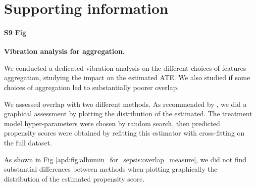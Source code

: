 \documentclass[10pt,letterpaper]{article}
\begin{document}
\vspace*{0.2in}

\section*{Supporting information}


\paragraph*{S9 Fig}
\label{apd:vibration_analysis_for_aggregation}
{\bf Vibration analysis for aggregation.}

We conducted a dedicated vibration analysis on the different choices of
features aggregation, studying the impact on the estimated ATE. We also
studied if some choices of aggregation led to substantially poorer overlap.

We assessed overlap with two different methods. As recommended by
\cite{austin2015moving}, we did a graphical assessment by plotting the
distribution of the estimated. The treatment model hyper-parameters were chosen
by random search, then predicted propensity scores were obtained by refitting
this estimator with cross-fitting on the full dataset.

As shown in Fig \ref{apd:fig:albumin_for_sepsis:overlap_measure}, we did not find substantial differences between methods
when plotting graphically the distribution of the estimated propensity score.
\end{document}
